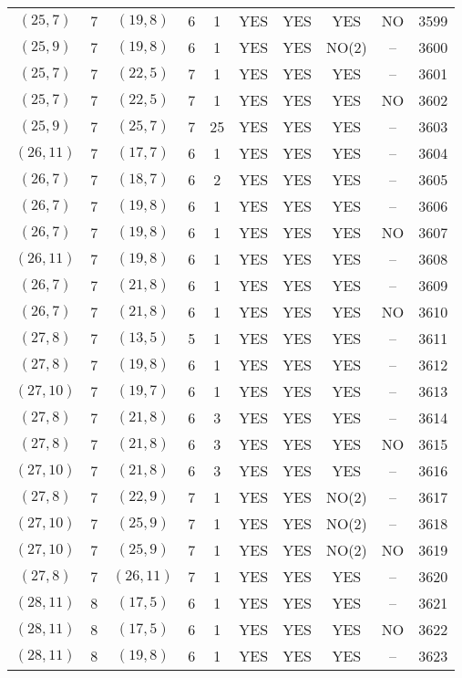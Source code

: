 \begin{longtable}{|c|c|c|c|c|c|c|c|c|c|}
$(25, 7)$ & 7 & $(19, 8)$ & 6 & 1 & YES & YES & YES & NO & 3599\\
$(25, 9)$ & 7 & $(19, 8)$ & 6 & 1 & YES & YES & NO(2) & -- & 3600\\
$(25, 7)$ & 7 & $(22, 5)$ & 7 & 1 & YES & YES & YES & -- & 3601\\
$(25, 7)$ & 7 & $(22, 5)$ & 7 & 1 & YES & YES & YES & NO & 3602\\
$(25, 9)$ & 7 & $(25, 7)$ & 7 & 25 & YES & YES & YES & -- & 3603\\
$(26, 11)$ & 7 & $(17, 7)$ & 6 & 1 & YES & YES & YES & -- & 3604\\
$(26, 7)$ & 7 & $(18, 7)$ & 6 & 2 & YES & YES & YES & -- & 3605\\
$(26, 7)$ & 7 & $(19, 8)$ & 6 & 1 & YES & YES & YES & -- & 3606\\
$(26, 7)$ & 7 & $(19, 8)$ & 6 & 1 & YES & YES & YES & NO & 3607\\
$(26, 11)$ & 7 & $(19, 8)$ & 6 & 1 & YES & YES & YES & -- & 3608\\
$(26, 7)$ & 7 & $(21, 8)$ & 6 & 1 & YES & YES & YES & -- & 3609\\
$(26, 7)$ & 7 & $(21, 8)$ & 6 & 1 & YES & YES & YES & NO & 3610\\
$(27, 8)$ & 7 & $(13, 5)$ & 5 & 1 & YES & YES & YES & -- & 3611\\
$(27, 8)$ & 7 & $(19, 8)$ & 6 & 1 & YES & YES & YES & -- & 3612\\
$(27, 10)$ & 7 & $(19, 7)$ & 6 & 1 & YES & YES & YES & -- & 3613\\
$(27, 8)$ & 7 & $(21, 8)$ & 6 & 3 & YES & YES & YES & -- & 3614\\
$(27, 8)$ & 7 & $(21, 8)$ & 6 & 3 & YES & YES & YES & NO & 3615\\
$(27, 10)$ & 7 & $(21, 8)$ & 6 & 3 & YES & YES & YES & -- & 3616\\
$(27, 8)$ & 7 & $(22, 9)$ & 7 & 1 & YES & YES & NO(2) & -- & 3617\\
$(27, 10)$ & 7 & $(25, 9)$ & 7 & 1 & YES & YES & NO(2) & -- & 3618\\
$(27, 10)$ & 7 & $(25, 9)$ & 7 & 1 & YES & YES & NO(2) & NO & 3619\\
$(27, 8)$ & 7 & $(26, 11)$ & 7 & 1 & YES & YES & YES & -- & 3620\\
$(28, 11)$ & 8 & $(17, 5)$ & 6 & 1 & YES & YES & YES & -- & 3621\\
$(28, 11)$ & 8 & $(17, 5)$ & 6 & 1 & YES & YES & YES & NO & 3622\\
$(28, 11)$ & 8 & $(19, 8)$ & 6 & 1 & YES & YES & YES & -- & 3623\\

\end{longtable}
